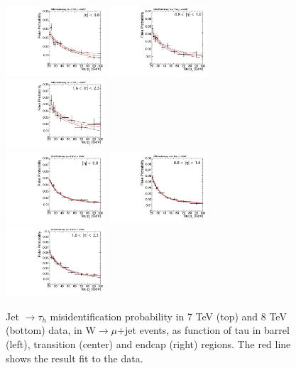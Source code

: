 \begin{figure}
  \includegraphics[width=0.33\textwidth]{4_Analisys/pics/7TeV/fakerate_fits/tau_fr_barrel.pdf}
  \includegraphics[width=0.33\textwidth]{4_Analisys/pics/7TeV/fakerate_fits/tau_fr_transition.pdf}
  \includegraphics[width=0.33\textwidth]{4_Analisys/pics/7TeV/fakerate_fits/tau_fr_endcap.pdf}\\
  \includegraphics[width=0.33\textwidth]{4_Analisys/pics/8TeV/fakerate_fits/tau_fr_barrel.pdf}
  \includegraphics[width=0.33\textwidth]{4_Analisys/pics/8TeV/fakerate_fits/tau_fr_transition.pdf}
  \includegraphics[width=0.33\textwidth]{4_Analisys/pics/8TeV/fakerate_fits/tau_fr_endcap.pdf}
  \caption{Jet $\to \tau_h$ misidentification probability in 7 TeV (top) and 8 TeV (bottom) data, in W$\to \mu$+jet events, as function of tau \pT in barrel (left), transition (center) and endcap (right) regions. The red line shows the result fit to the data.}
  \label{fig:LLT_tau_FR}
\end{figure}


